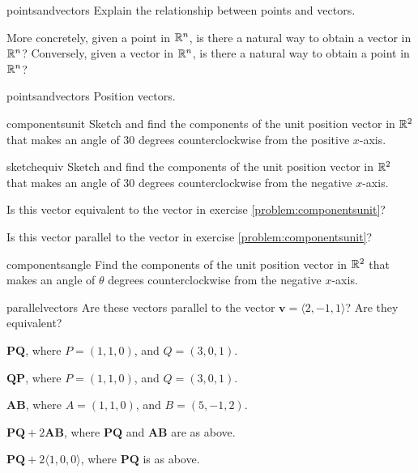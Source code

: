 \begin{problem}{pointsandvectors}
Explain the relationship between points and vectors.

More concretely, given a point in $\mathbb{R}^n$, is there a natural way to obtain a vector in $\mathbb{R}^n$?  Conversely, given a vector in $\mathbb{R}^n$, is there a natural way to obtain a point in $\mathbb{R}^n$?
\end{problem}

\begin{answer}{pointsandvectors}
Position vectors.
\end{answer}

\begin{problem}{componentsunit}
    Sketch and find the components of the unit position vector in $\mathbb{R}^2$ that makes an angle of $30$ degrees counterclockwise from the positive $x$-axis.
    
\end{problem}

\begin{problem}{sketchequiv}
    Sketch and find the components of the unit position vector in $\mathbb{R}^2$  that makes an angle of $30$ degrees counterclockwise from the negative $x$-axis.
    
    \begin{subproblems}
    \item Is this vector equivalent to the vector in exercise \ref{problem:componentsunit}?
    \item Is this vector parallel to the vector in exercise \ref{problem:componentsunit}?
    \end{subproblems}
    
\end{problem}

\begin{problem}{componentsangle}
    Find the components of the unit position vector in $\mathbb{R}^2$  that makes an angle of $\theta$ degrees counterclockwise from the negative $x$-axis.
\end{problem}

\begin{problem}{parallelvectors}
    Are these vectors parallel to the vector $\bm{v} = \langle 2, -1, 1 \rangle$?  Are they equivalent?
    
    \begin{subproblems}
    \item $\bm{PQ}$, where $P = (1,1,0)$, and $Q = (3, 0, 1)$.
    \item $\bm{QP}$, where $P = (1,1,0)$, and $Q = (3, 0, 1)$.
    \item $\bm{AB}$, where $A = (1,1,0)$, and $B = (5, -1, 2)$.
    \item $\bm{PQ} + 2\bm{AB}$, where $\bm{PQ}$ and $\bm{AB}$ are as above.
    \item $\bm{PQ} + 2\langle 1, 0 ,0 \rangle$, where $\bm{PQ}$ is as above.
    \end{subproblems}
\end{problem}

